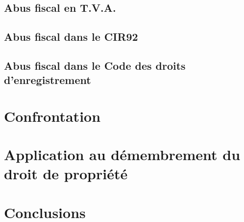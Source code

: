 \documentclass[12pt]{report}
\begin{document}
\section{Abus fiscal en T.V.A.}
\section{Abus fiscal dans le CIR92}
\section{Abus fiscal dans le Code des droits d'enregistrement}

\chapter{Confrontation}
\chapter{Application au démembrement du droit de propriété}
\chapter{Conclusions}

\newpage


\null
\thispagestyle{empty}

\newpage

\null
\thispagestyle{empty}



\nocite{*}

\end{document}
